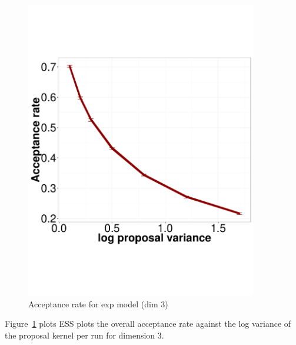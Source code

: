   \begin{figure}%
  \centering
  \begin{minipage}[hp]{0.45\linewidth}
  \centering
    \includegraphics [width=0.90\textwidth, angle=0]{figs/acc_rate_exp_d3.pdf}
      \end{minipage}
    \caption{Acceptance rate for exp model (dim 3)}
	\label{fig:acc_exp}
  \end{figure}

Figure~\ref{fig:acc_exp} plots ESS plots the overall  acceptance rate against 
the log variance of the proposal kernel per run for dimension $3$. 



